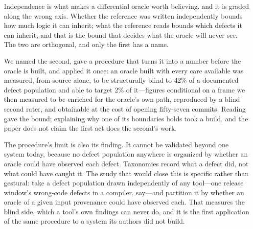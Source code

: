Independence is what makes a differential oracle worth believing, and it is graded
along the wrong axis. Whether the reference was written independently bounds how
much logic it can inherit; what the reference reads bounds which defects it can
inherit, and that is the bound that decides what the oracle will never see. The two
are orthogonal, and only the first has a name.

We named the second, gave a procedure that turns it into a number before the oracle
is built, and applied it once: an oracle built with every care available was
measured, from source alone, to be structurally blind to 42\% of a documented defect
population and able to target 2\% of it---figures conditional on a frame we then
measured to be enriched for the oracle's own path, reproduced by a blind second rater,
and obtainable at the cost of opening fifty-seven commits. Reading gave the bound; explaining why one of its boundaries holds took a
build, and the paper does not claim the first act does the second's work.

The procedure's limit is also its finding. It cannot be validated beyond one system
today, because no defect population anywhere is organized by whether an oracle could
have observed each defect. Taxonomies record what a defect did, not what could have
caught it. The study that would close this is specific rather than gestural: take a
defect population drawn independently of any tool---one release window's
wrong-code defects in a compiler, say---and partition it by whether an oracle of a
given input provenance could have observed each. That measures the blind side, which
a tool's own findings can never do, and it is the first application of the same
procedure to a system its authors did not build.

